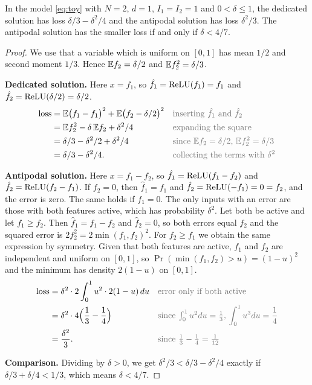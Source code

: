 \begin{proposition}\label{prop:toy}
In the model \eqref{eq:toy} with $N=2$, $d=1$, $I_1=I_2=1$ and $0<\delta\le1$, the dedicated solution has loss
$\delta/3-\delta^2/4$ and the antipodal solution has loss $\delta^2/3$. The antipodal solution has the smaller
loss if and only if $\delta<4/7$.
\end{proposition}
\begin{proof}
We use that a variable which is uniform on $[0,1]$ has mean $1/2$ and second moment $1/3$. Hence
$\mathbb{E} f_2=\delta/2$ and $\mathbb{E} f_2^2=\delta/3$.

\textbf{Dedicated solution.} Here $x=f_1$, so $\hat f_1=\mathrm{ReLU}(f_1)=f_1$ and $\hat f_2=\mathrm{ReLU}(\delta/2)=\delta/2$.
\begin{align*}
\text{loss} &= \E\big(f_1-f_1\big)^2+\E\big(f_2-\delta/2\big)^2 && \by{inserting $\hat f_1$ and $\hat f_2$}\\
&= \E f_2^2-\delta\,\E f_2+\delta^2/4 && \by{expanding the square}\\
&= \delta/3-\delta^2/2+\delta^2/4 && \by{since $\E f_2=\delta/2$, $\E f_2^2=\delta/3$}\\
&= \delta/3-\delta^2/4. && \by{collecting the terms with $\delta^2$}
\end{align*}

\textbf{Antipodal solution.} Here $x=f_1-f_2$, so $\hat f_1=\mathrm{ReLU}(f_1-f_2)$ and $\hat f_2=\mathrm{ReLU}(f_2-f_1)$. If
$f_2=0$, then $\hat f_1=f_1$ and $\hat f_2=\mathrm{ReLU}(-f_1)=0=f_2$, and the error is zero. The same holds if $f_1=0$.
The only inputs with an error are those with both features active, which has probability $\delta^2$. Let both
be active and let $f_1\ge f_2$. Then $\hat f_1=f_1-f_2$ and $\hat f_2=0$, so both errors equal $f_2$ and the
squared error is $2f_2^2=2\min(f_1,f_2)^2$. For $f_2\ge f_1$ we obtain the same expression by symmetry. Given that
both features are active, $f_1$ and $f_2$ are independent and uniform on $[0,1]$, so
$\Pr(\min(f_1,f_2)>u)=(1-u)^2$ and the minimum has density $2(1-u)$ on $[0,1]$.
\begin{align*}
\text{loss} &= \delta^2\cdot 2\int_0^1u^2\cdot 2(1-u)\,du && \by{error only if both active}\\
&= \delta^2\cdot 4\Big(\frac13-\frac14\Big) && \by{since $\textstyle\int_0^1u^2du=\frac13$, $\int_0^1u^3du=\frac14$}\\
&= \frac{\delta^2}{3}. && \by{since $\textstyle\frac13-\frac14=\frac1{12}$}
\end{align*}

\textbf{Comparison.} Dividing by $\delta>0$, we get
$\delta^2/3<\delta/3-\delta^2/4$ exactly if $\delta/3+\delta/4<1/3$, which means $\delta<4/7$.
\end{proof}

